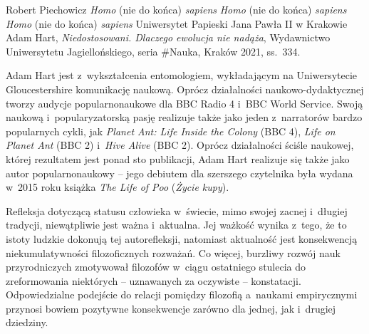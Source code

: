 \begin{newrevplenv}{Robert Piechowicz}
	{\textit{Homo} (nie do końca) \textit{sapiens}}
	{\textit{Homo} (nie do końca) \textit{sapiens}}
	{\textit{Homo} (nie do końca) \textit{sapiens}}
	{Uniwersytet Papieski Jana Pawła II w Krakowie}
	{Adam Hart, \textit{Niedostosowani. Dlaczego ewolucja nie nadąża}, Wydawnictwo Uniwersytetu Jagiellońskiego, seria \#Nauka, Kraków 2021, ss.~334.}



\lettrine[loversize=0.13,lines=2,lraise=-0.03,nindent=0em,findent=0.2pt]%
{A}{}dam Hart jest z~wykształcenia entomologiem, wykładającym na Uniwersytecie Gloucestershire komunikację naukową. Oprócz działalności naukowo-dydaktycznej tworzy audycje popularnonaukowe dla BBC Radio 4 i~BBC World Service. Swoją naukową i~popularyzatorską pasję realizuje także jako jeden z~narratorów bardzo popularnych cykli, jak \textit{Planet Ant: Life Inside the Colony} (BBC 4), \textit{Life on Planet Ant} (BBC 2) i~\textit{Hive Alive} (BBC 2). Oprócz działalności ściśle naukowej, której rezultatem jest ponad sto publikacji, Adam Hart realizuje się także jako autor popularnonaukowy -- jego debiutem dla szerszego czytelnika była wydana w~2015 roku książka \textit{The Life of Poo} (\textit{Życie kupy}).

Refleksja dotyczącą statusu człowieka w~świecie, mimo swojej zacnej i~długiej tradycji, niewątpliwie jest ważna i~aktualna. Jej ważkość wynika z~tego, że to istoty ludzkie dokonują tej autorefleksji, natomiast aktualność jest konsekwencją niekumulatywności filozoficznych rozważań. Co więcej, burzliwy rozwój nauk przyrodniczych zmotywował filozofów w~ciągu ostatniego stulecia do zreformowania niektórych -- uznawanych za oczywiste -- konstatacji. Odpowiedzialne podejście do relacji pomiędzy filozofią a~naukami empirycznymi przynosi bowiem pozytywne konsekwencje zarówno dla jednej, jak i~drugiej dziedziny.


\end{newrevplenv}
